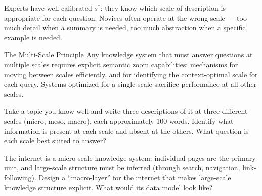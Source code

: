 Experts have well-calibrated $s^*$: they know which scale of description
is appropriate for each question. Novices often operate at the wrong
scale — too much detail when a summary is needed, too much abstraction
when a specific example is needed.

\begin{namedthm}{The Multi-Scale Principle}
  Any knowledge system that must answer questions at multiple scales
  requires explicit semantic zoom capabilities: mechanisms for moving
  between scales efficiently, and for identifying the context-optimal
  scale for each query. Systems optimized for a single scale sacrifice
  performance at all other scales.
\end{namedthm}

\begin{exercise}
  Take a topic you know well and write three descriptions of it at
  three different scales (micro, meso, macro), each approximately
  100 words. Identify what information is present at each scale and
  absent at the others. What question is each scale best suited to answer?
\end{exercise}

\begin{exercise}
  The internet is a micro-scale knowledge system: individual pages
  are the primary unit, and large-scale structure must be inferred
  (through search, navigation, link-following). Design a ``macro-layer''
  for the internet that makes large-scale knowledge structure explicit.
  What would its data model look like?
\end{exercise}
